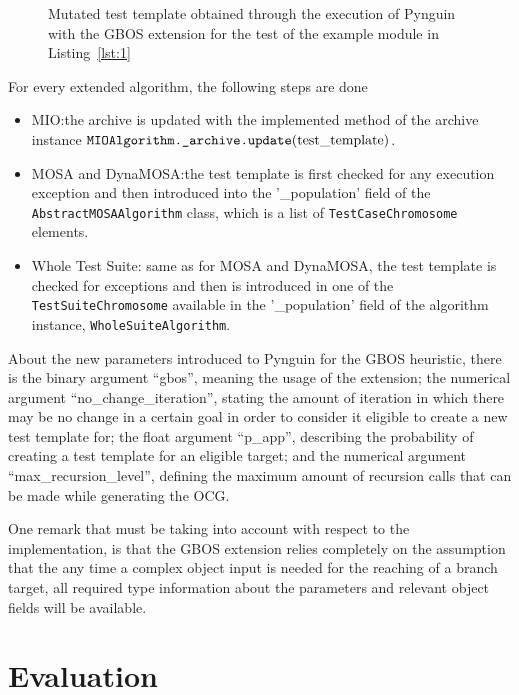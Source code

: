 \documentclass[%
  chapterprefix=false,%
  open=right,%
  twoside=true,%
  paper=a4,%
  logofile={Figures/logo.png},%
  thesistype=master,%
  UKenglish,%
]{se2thesis}
\newcommand{\classname}[1]{\texttt{#1}}
\newcommand{\callable}[2][]{\(\text{\texttt{#2}}(#1)\)}
\begin{document}
\begin{figure}
  \inputminted[linenos]{python}{Figures/template-result.py}
  \caption{Mutated test template obtained through the execution of Pynguin with the GBOS extension for the test of the example module in Listing~\ref{lst:1}\label{lst:6}}
\end{figure}

For every extended algorithm, the following steps are done

\begin{itemize}
  \item MIO:\@ the archive is updated with the implemented method of the archive instance \callable[\text{test\_template}]{MIOAlgorithm.\_archive.update}.

  \item MOSA and DynaMOSA:\@ the test template is first checked for any execution exception and then introduced into the '\_population' field of the \classname{AbstractMOSAAlgorithm} class, which is a list of \classname{TestCaseChromosome} elements.
  \item Whole Test Suite: same as for MOSA and DynaMOSA, the test template is checked for exceptions and then is introduced in one of the \classname{TestSuiteChromosome} available in the '\_population' field of the algorithm instance, \classname{WholeSuiteAlgorithm}.
\end{itemize}

About the new parameters introduced to Pynguin for the GBOS heuristic, there is the binary argument ``gbos'', meaning the usage of the extension; the numerical argument ``no\_change\_iteration'', stating the amount of iteration in which there may be no change in a certain goal in order to consider it eligible to create a new test template for; the float argument ``p\_app'', describing the probability of creating a test template for an eligible target; and the numerical argument ``max\_recursion\_level'', defining the maximum amount of recursion calls that can be made while generating the OCG.\@

One remark that must be taking into account with respect to the implementation, is that the GBOS extension relies completely on the assumption that the any time a complex object input is needed for the reaching of a branch target, all required type information about the parameters and relevant object fields will be available. 

\chapter{Evaluation}~\label{chap:evaluation}
\end{document}
